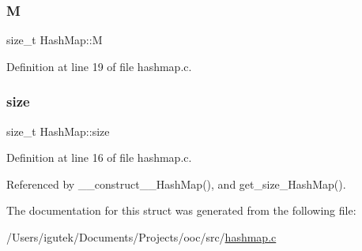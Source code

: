 \mbox{\label{structHashMap_a1afdecfc482f9bcbf1af8e77995690b9}} 
\subsubsection{\texorpdfstring{M}{M}}
{\footnotesize\ttfamily size\+\_\+t Hash\+Map\+::M}



Definition at line 19 of file hashmap.\+c.

\mbox{\label{structHashMap_aae8bf9f119b0659b9ad29261e2e3d520}} 
\subsubsection{\texorpdfstring{size}{size}}
{\footnotesize\ttfamily size\+\_\+t Hash\+Map\+::size}



Definition at line 16 of file hashmap.\+c.



Referenced by \+\_\+\+\_\+construct\+\_\+\+\_\+\+Hash\+Map(), and get\+\_\+size\+\_\+\+Hash\+Map().



The documentation for this struct was generated from the following file\+:\begin{DoxyCompactItemize}
\item 
/\+Users/igutek/\+Documents/\+Projects/ooc/src/\mbox{\hyperlink{hashmap_8c}{hashmap.\+c}}\end{DoxyCompactItemize}
